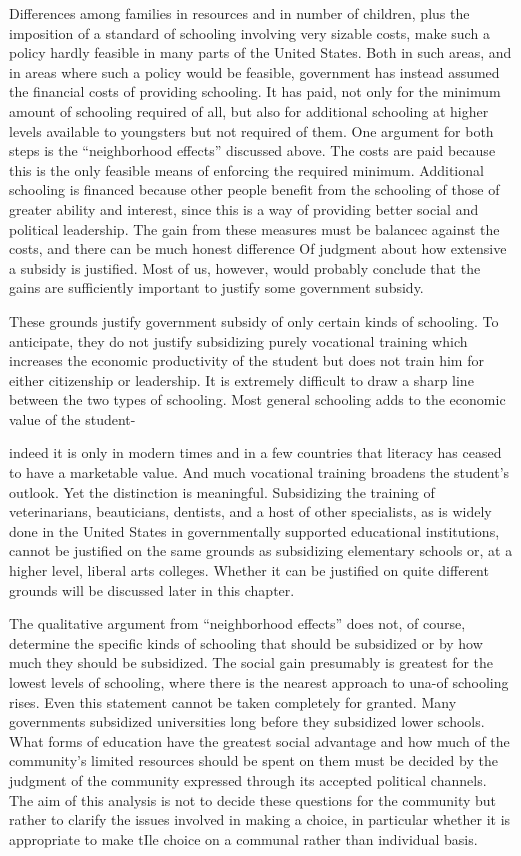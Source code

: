 \documentclass[11pt,openany]{book}
\begin{document}
Differences among families in resources and in number of children, plus the imposition of a standard of schooling involving very sizable costs, make such a policy hardly feasible in many parts of the United States. Both in such areas, and in areas where such a policy would be feasible, government has instead assumed the financial costs of providing schooling. It has paid, not only for the minimum amount of schooling required of all, but also for additional schooling at higher levels available to youngsters but not required of them. One argument for both steps is the ``neighborhood effects'' discussed above. The costs are paid because this is the only feasible means of enforcing the required minimum. Additional schooling is financed because other people benefit from the schooling of those of greater ability and interest, since this is a way of providing better social and political leadership. The gain from these measures must be balancec against the costs, and there can be much honest difference Of judgment about how extensive a subsidy is justified. Most of us, however, would probably conclude that the gains are sufficiently important to justify some government subsidy.

These grounds justify government subsidy of only certain kinds of schooling. To anticipate, they do not justify subsidizing purely vocational training which increases the economic productivity of the student but does not train him for either citizenship or leadership. It is extremely difficult to draw a sharp line between the two types of schooling. Most general schooling adds to the economic value of the student-

indeed it is only in modern times and in a few countries that literacy has ceased to have a marketable value. And much vocational training broadens the student's outlook. Yet the distinction is meaningful. Subsidizing the training of veterinarians, beauticians, dentists, and a host of other specialists, as is widely done in the United States in governmentally supported educational institutions, cannot be justified on the same grounds as subsidizing elementary schools or, at a higher level, liberal arts colleges. Whether it can be justified on quite different grounds will be discussed later in this chapter.

The qualitative argument from ``neighborhood effects'' does not, of course, determine the specific kinds of schooling that should be subsidized or by how much they should be subsidized. The social gain presumably is greatest for the lowest levels of schooling, where there is the nearest approach to una-of schooling rises. Even this statement cannot be taken completely for granted. Many governments subsidized universities long before they subsidized lower schools. What forms of education have the greatest social advantage and how much of the community's limited resources should be spent on them must be decided by the judgment of the community expressed through its accepted political channels. The aim of this analysis is not to decide these questions for the community but rather to clarify the issues involved in making a choice, in particular whether it is appropriate to make tIle choice on a communal rather than individual basis.
\end{document}

